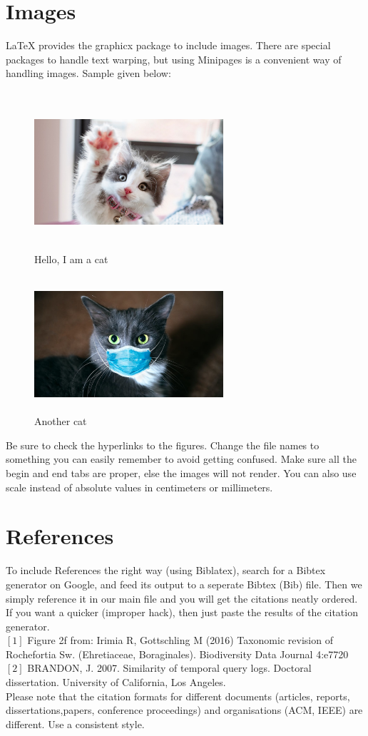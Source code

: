 \documentclass[ 12pt,a4paper,twocolumn,fleqn]{article}
\begin{document}
\section{Images}
\LaTeX{} provides the graphicx package to include images. There are special packages to handle text warping, but using Minipages is a convenient way of handling images. Sample given below: \\
\hfill
\\
\begin{figure}[H]
\begin{minipage}{0.5\textwidth}
\includegraphics[width=7cm,height=5cm]{media/Kitten}
\centering
\caption{Hello, I am a cat}
\end{minipage}
\begin{minipage}
{.5\textwidth}
\includegraphics[width=7cm,height=5cm]{media/Kitten2}
\centering
\caption{Another cat}
\end{minipage}
\end{figure}
Be sure to check the hyperlinks to the figures. Change the file names to something you can easily remember to avoid getting confused. Make sure all the begin and end tabs are proper, else the images will not render. You can also use scale instead of absolute values in centimeters or millimeters.
\section{References}

To include References the right way (using Biblatex), search for a Bibtex generator on Google, and feed its output to a seperate Bibtex (Bib) file. Then we simply reference it in our main file and you will get the citations neatly ordered. If you want a quicker (improper hack), then just paste the results of the citation generator. \\
$[1]$ Figure 2f from: Irimia R, Gottschling M (2016) Taxonomic revision of Rochefortia Sw. (Ehretiaceae, Boraginales). Biodiversity Data Journal 4:e7720 
\\
$[2]$ BRANDON, J. 2007. Similarity of temporal query logs. Doctoral dissertation. University of California, Los Angeles. \\

Please note that the citation formats for different documents (articles, reports, dissertations,papers, conference proceedings) and organisations (ACM, IEEE) are different. Use a consistent style.
\end{document}

